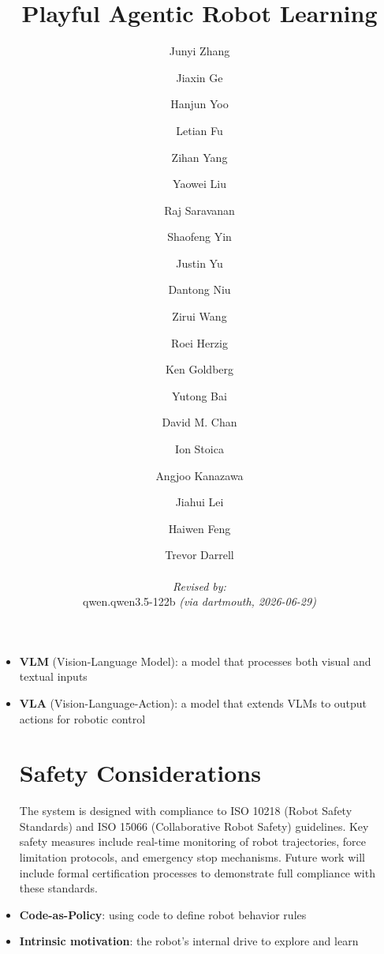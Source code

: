 \documentclass{article}
\title{Playful Agentic Robot Learning}%
\author{
  Junyi Zhang \and Jiaxin Ge \and Hanjun Yoo \and Letian Fu \and Zihan Yang \and Yaowei Liu \and Raj Saravanan \and Shaofeng Yin \and Justin Yu \and Dantong Niu \and Zirui Wang \and Roei Herzig \and Ken Goldberg \and Yutong Bai \and David M. Chan \and Ion Stoica \and Angjoo Kanazawa \and Jiahui Lei \and Haiwen Feng \and Trevor Darrell
  \par\hrule\par
  \textit{Revised by:}\\
  qwen.qwen3.5-122b \textit{(via dartmouth, 2026-06-29)}
}
\begin{document}
\newcommand{\VLA}{Vision-Language Action}
\newcommand{\VLM}{Vision-Language Model}
\newcommand{\LLM}{Large Language Model}
\newcommand{\CaPX}{CaP-X}
\newcommand{\CaPAgent}{CaP-Agent0}

\begin{itemize}[leftmargin=*,nosep,after={\vspace{0.5em}}]
\item \textbf{VLM} (Vision-Language Model): a model that processes both visual and textual inputs
\item \textbf{VLA} (Vision-Language-Action): a model that extends VLMs to output actions for robotic control

\section{Safety Considerations}
The system is designed with compliance to ISO 10218 (Robot Safety Standards) and ISO 15066 (Collaborative Robot Safety) guidelines. Key safety measures include real-time monitoring of robot trajectories, force limitation protocols, and emergency stop mechanisms. Future work will include formal certification processes to demonstrate full compliance with these standards.
\item \textbf{Code-as-Policy}: using code to define robot behavior rules
\item \textbf{Intrinsic motivation}: the robot's internal drive to explore and learn
\end{itemize}
\end{document}
